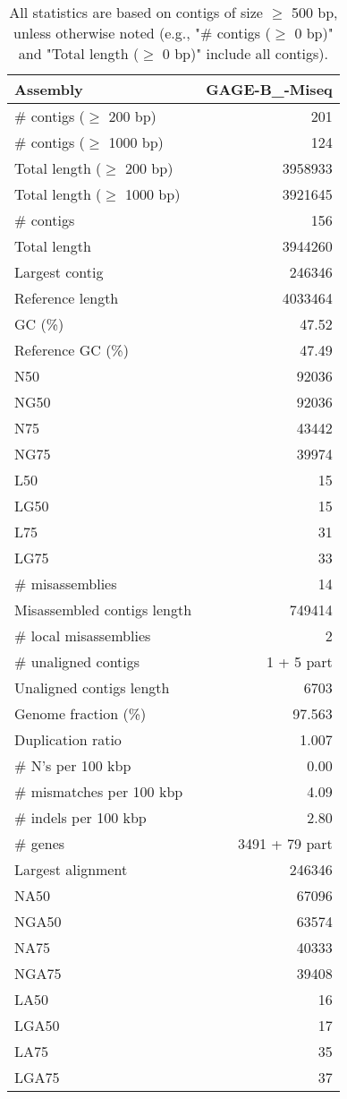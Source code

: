 \documentclass[12pt,a4paper]{article}
\begin{document}
\begin{table}[ht]
\begin{center}
\caption{All statistics are based on contigs of size $\geq$ 500 bp, unless otherwise noted (e.g., "\# contigs ($\geq$ 0 bp)" and "Total length ($\geq$ 0 bp)" include all contigs).}
\begin{tabular}{|l*{1}{|r}|}
\hline
Assembly & GAGE-B\_-Miseq \\ \hline
\# contigs ($\geq$ 200 bp) & 201 \\ \hline
\# contigs ($\geq$ 1000 bp) & 124 \\ \hline
Total length ($\geq$ 200 bp) & 3958933 \\ \hline
Total length ($\geq$ 1000 bp) & 3921645 \\ \hline
\# contigs & 156 \\ \hline
Total length & 3944260 \\ \hline
Largest contig & 246346 \\ \hline
Reference length & 4033464 \\ \hline
GC (\%) & 47.52 \\ \hline
Reference GC (\%) & 47.49 \\ \hline
N50 & 92036 \\ \hline
NG50 & 92036 \\ \hline
N75 & 43442 \\ \hline
NG75 & 39974 \\ \hline
L50 & 15 \\ \hline
LG50 & 15 \\ \hline
L75 & 31 \\ \hline
LG75 & 33 \\ \hline
\# misassemblies & 14 \\ \hline
Misassembled contigs length & 749414 \\ \hline
\# local misassemblies & 2 \\ \hline
\# unaligned contigs & 1 + 5 part \\ \hline
Unaligned contigs length & 6703 \\ \hline
Genome fraction (\%) & 97.563 \\ \hline
Duplication ratio & 1.007 \\ \hline
\# N's per 100 kbp & 0.00 \\ \hline
\# mismatches per 100 kbp & 4.09 \\ \hline
\# indels per 100 kbp & 2.80 \\ \hline
\# genes & 3491 + 79 part \\ \hline
Largest alignment & 246346 \\ \hline
NA50 & 67096 \\ \hline
NGA50 & 63574 \\ \hline
NA75 & 40333 \\ \hline
NGA75 & 39408 \\ \hline
LA50 & 16 \\ \hline
LGA50 & 17 \\ \hline
LA75 & 35 \\ \hline
LGA75 & 37 \\ \hline
\end{tabular}
\end{center}
\end{table}
\end{document}
